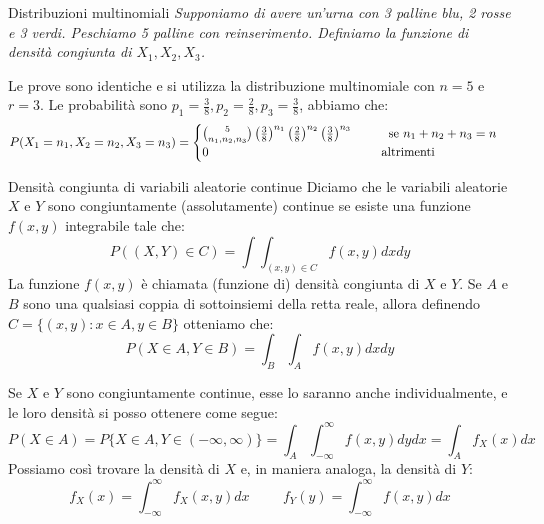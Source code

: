 \begin{Example}{Distribuzioni multinomiali}{}
    \textit{Supponiamo di avere un'urna con 3 palline blu, 2 rosse e 3 verdi. Peschiamo 5 palline con reinserimento. Definiamo la funzione di densità congiunta di $X_1, X_2, X_3$.}

    Le prove sono identiche e si utilizza la distribuzione multinomiale con $n=5$ e $r=3$. Le probabilità sono $p_1=\frac{3}{8}, p_2=\frac{2}{8}, p_3=\frac{3}{8}$, abbiamo che:
    \begin{equation*}
        P(X_1=n_1,X_2=n_2,X_3=n_3)=\begin{cases}
            \binom{5}{n_1,n_2,n_3}\left(\frac{3}{8}\right)^{n_1}\left(\frac{2}{8}\right)^{n_2}\left(\frac{3}{8}\right)^{n_3}\hspace{1cm}\mbox{se }n_1+n_2+n_3=n\\0\hspace{4.9cm}\mbox{altrimenti}
        \end{cases}
    \end{equation*}
\end{Example}

\begin{Definition}{Densità congiunta di variabili aleatorie continue}{}
    Diciamo che le variabili aleatorie $X$ e $Y$ sono congiuntamente (assolutamente) continue se esiste una funzione $f(x, y)$ integrabile tale che:
    \begin{equation*}
        P((X,Y)\in C)=\int\int _{(x,y)\in C}f(x,y)dxdy
    \end{equation*}
    La funzione $f(x, y)$ è chiamata (funzione di) densità congiunta di $X$ e $Y$. Se $A$ e $B$ sono una qualsiasi coppia di sottoinsiemi della retta reale, allora definendo $C = \{(x, y):x\in A, y\in B\}$ otteniamo che:
    \begin{equation*}
        P(X\in A, Y\in B)=\int_B\int_Af(x,y)dxdy
    \end{equation*}
\end{Definition}

Se $X$ e $Y$ sono congiuntamente continue, esse lo saranno anche individualmente, e le loro densità si posso ottenere come segue:
\begin{equation*}
    P(X\in A)=P\{X\in A, Y\in(-\infty,\infty)\}=\int_A\int^\infty_{-\infty}f(x,y)dydx=\int_Af_X(x)dx
\end{equation*}
Possiamo così trovare la densità di $X$ e, in maniera analoga, la densità di $Y$:
\begin{equation*}
    f_X(x)=\int^\infty_{-\infty}f_X(x,y)dx\hspace{1cm}f_Y(y)=\int^\infty_{-\infty}f(x,y)dx
\end{equation*}


